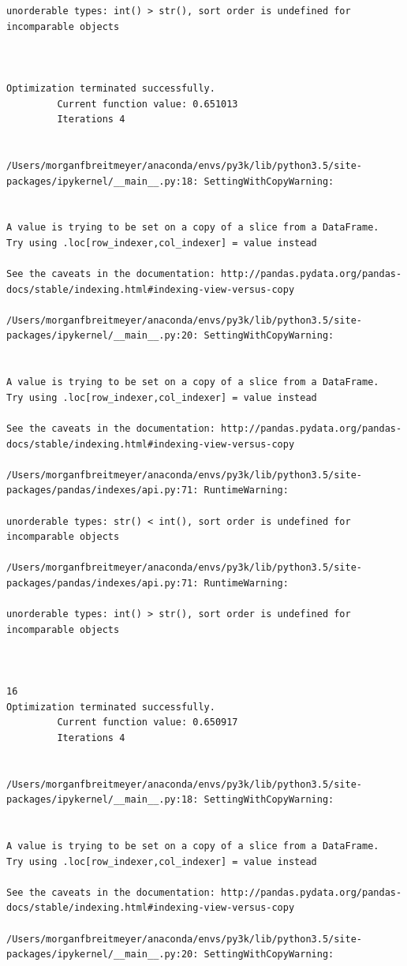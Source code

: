 \begin{lstlisting}
unorderable types: int() > str(), sort order is undefined for incomparable objects



Optimization terminated successfully.
         Current function value: 0.651013
         Iterations 4


/Users/morganfbreitmeyer/anaconda/envs/py3k/lib/python3.5/site-packages/ipykernel/__main__.py:18: SettingWithCopyWarning:


A value is trying to be set on a copy of a slice from a DataFrame.
Try using .loc[row_indexer,col_indexer] = value instead

See the caveats in the documentation: http://pandas.pydata.org/pandas-docs/stable/indexing.html#indexing-view-versus-copy

/Users/morganfbreitmeyer/anaconda/envs/py3k/lib/python3.5/site-packages/ipykernel/__main__.py:20: SettingWithCopyWarning:


A value is trying to be set on a copy of a slice from a DataFrame.
Try using .loc[row_indexer,col_indexer] = value instead

See the caveats in the documentation: http://pandas.pydata.org/pandas-docs/stable/indexing.html#indexing-view-versus-copy

/Users/morganfbreitmeyer/anaconda/envs/py3k/lib/python3.5/site-packages/pandas/indexes/api.py:71: RuntimeWarning:

unorderable types: str() < int(), sort order is undefined for incomparable objects

/Users/morganfbreitmeyer/anaconda/envs/py3k/lib/python3.5/site-packages/pandas/indexes/api.py:71: RuntimeWarning:

unorderable types: int() > str(), sort order is undefined for incomparable objects



16
Optimization terminated successfully.
         Current function value: 0.650917
         Iterations 4


/Users/morganfbreitmeyer/anaconda/envs/py3k/lib/python3.5/site-packages/ipykernel/__main__.py:18: SettingWithCopyWarning:


A value is trying to be set on a copy of a slice from a DataFrame.
Try using .loc[row_indexer,col_indexer] = value instead

See the caveats in the documentation: http://pandas.pydata.org/pandas-docs/stable/indexing.html#indexing-view-versus-copy

/Users/morganfbreitmeyer/anaconda/envs/py3k/lib/python3.5/site-packages/ipykernel/__main__.py:20: SettingWithCopyWarning:



\end{lstlisting}

